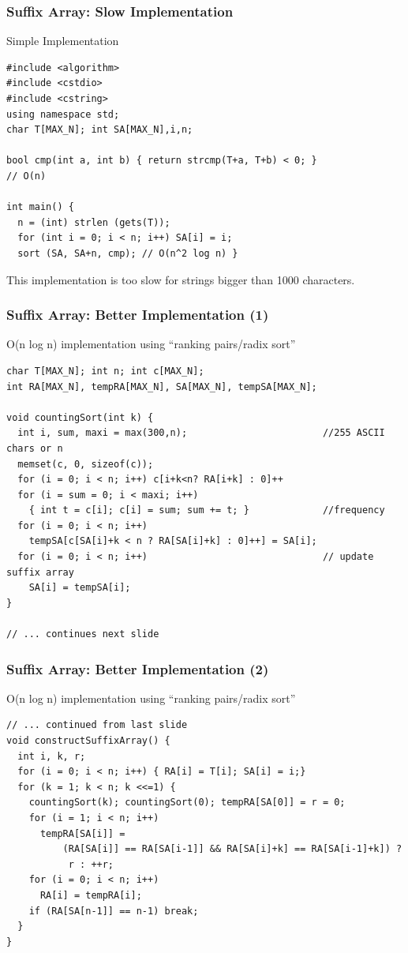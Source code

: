 \begin{frame}[fragile]
  \frametitle{Suffix Array: Slow Implementation}
  {\smaller
    \begin{exampleblock}{Simple Implementation}
\begin{verbatim}
#include <algorithm>
#include <cstdio>
#include <cstring>
using namespace std;
char T[MAX_N]; int SA[MAX_N],i,n;

bool cmp(int a, int b) { return strcmp(T+a, T+b) < 0; }
// O(n)

int main() {
  n = (int) strlen (gets(T));
  for (int i = 0; i < n; i++) SA[i] = i;
  sort (SA, SA+n, cmp); // O(n^2 log n) }
\end{verbatim}
\end{exampleblock}}

    This implementation is too slow for strings bigger than 1000 characters.
\end{frame}

\begin{frame}[fragile]
  \frametitle{Suffix Array: Better Implementation (1)}
  {\smaller
    \begin{exampleblock}{O(n log n) implementation using ``ranking pairs/radix sort''}
\begin{verbatim}
char T[MAX_N]; int n; int c[MAX_N];
int RA[MAX_N], tempRA[MAX_N], SA[MAX_N], tempSA[MAX_N];

void countingSort(int k) {
  int i, sum, maxi = max(300,n);                        //255 ASCII chars or n
  memset(c, 0, sizeof(c));
  for (i = 0; i < n; i++) c[i+k<n? RA[i+k] : 0]++
  for (i = sum = 0; i < maxi; i++)
    { int t = c[i]; c[i] = sum; sum += t; }             //frequency
  for (i = 0; i < n; i++)
    tempSA[c[SA[i]+k < n ? RA[SA[i]+k] : 0]++] = SA[i];
  for (i = 0; i < n; i++)                               // update suffix array
    SA[i] = tempSA[i];
}

// ... continues next slide
\end{verbatim}
    \end{exampleblock}
  }
\end{frame}

\begin{frame}[fragile]
  \frametitle{Suffix Array: Better Implementation (2)}
  {\smaller
    \begin{exampleblock}{O(n log n) implementation using ``ranking pairs/radix sort''}
\begin{verbatim}
// ... continued from last slide
void constructSuffixArray() {
  int i, k, r;
  for (i = 0; i < n; i++) { RA[i] = T[i]; SA[i] = i;}
  for (k = 1; k < n; k <<=1) {
    countingSort(k); countingSort(0); tempRA[SA[0]] = r = 0;
    for (i = 1; i < n; i++)
      tempRA[SA[i]] =
          (RA[SA[i]] == RA[SA[i-1]] && RA[SA[i]+k] == RA[SA[i-1]+k]) ?
           r : ++r;
    for (i = 0; i < n; i++)
      RA[i] = tempRA[i];
    if (RA[SA[n-1]] == n-1) break;
  }
}
\end{verbatim}
    \end{exampleblock}
  }
\end{frame}

